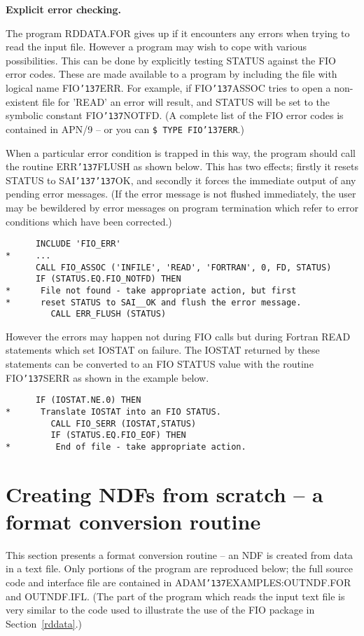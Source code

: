 \documentclass[twoside,11pt]{article}
\renewcommand{\_}{{\tt\char'137}}
\newcommand{\xlabel}[1]{}
\begin{document}
{\bigskip\large\bf Explicit error checking.}

The program RDDATA.FOR gives up if it encounters any errors when trying to
read the input file.
However a program may wish to cope with various possibilities.
This can be done by explicitly testing STATUS against the FIO error codes.
These are made available to a program by including the file with
logical name FIO\_ERR.
For example, if FIO\_ASSOC tries to open a non-existent file for 'READ'
an error will result, and STATUS will be set to the symbolic constant
FIO\_NOTFD.
(A complete list of the FIO error codes is contained in APN/9
-- or you can {\tt \$ TYPE FIO\_ERR}.)

When a particular error condition is trapped in this way, the program
should call the routine ERR\_FLUSH as shown below. This has two effects;
firstly it resets STATUS
to SAI\_\_OK, and secondly it forces the immediate output of any pending
error messages. (If the error message is not flushed immediately, the user
may be bewildered by error messages on program termination which refer to
error conditions which have been corrected.)
\begin{verbatim}
      INCLUDE 'FIO_ERR'
*     ...
      CALL FIO_ASSOC ('INFILE', 'READ', 'FORTRAN', 0, FD, STATUS)
      IF (STATUS.EQ.FIO_NOTFD) THEN
*      File not found - take appropriate action, but first
*      reset STATUS to SAI__OK and flush the error message.
         CALL ERR_FLUSH (STATUS)
\end{verbatim}
However the errors may happen not during FIO calls
but during Fortran READ statements which set
IOSTAT on failure.
The IOSTAT returned by these statements can be converted to an FIO STATUS
value with the routine FIO\_SERR as shown in the example below.
\begin{verbatim}
      IF (IOSTAT.NE.0) THEN
*      Translate IOSTAT into an FIO STATUS.
         CALL FIO_SERR (IOSTAT,STATUS)
         IF (STATUS.EQ.FIO_EOF) THEN
*         End of file - take appropriate action.
\end{verbatim}

\newpage
\section{Creating NDFs from scratch -- a format conversion routine\label{outndf}\xlabel{creating_ndfs_from_scratch}}

This section presents a format conversion routine --
an NDF is created from data in a text file.
Only portions of the program are reproduced below;
the full source code and interface file are contained in
ADAM\_EXAMPLES:OUTNDF.FOR and OUTNDF.IFL.
(The part of the program which reads the input text file is very similar
to the code used to illustrate the use of the FIO package
in Section~\ref{rddata}.)
\end{document}
